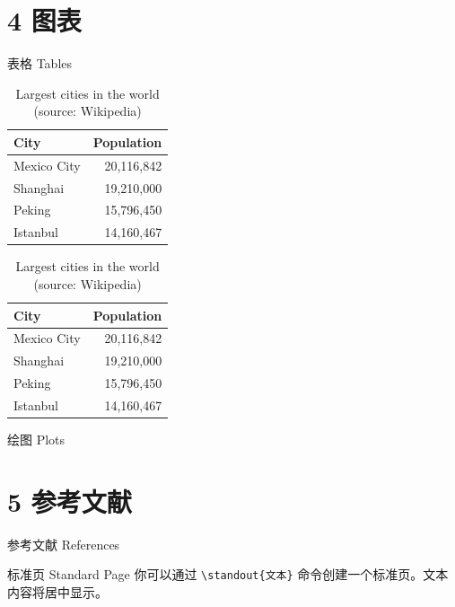 \documentclass[10pt,aspectratio=169,fontset=none]{ctexbeamer}
\begin{document}
    \section{4 图表}

    \begin{frame}{表格 Tables}
            \begin{table}
            \caption{Largest cities in the world (source: Wikipedia)}
            \label{tab:table1}
            \begin{tabular}{@{} lr @{}}
            \toprule
            City & Population\\
            \midrule
            Mexico City & 20,116,842\\
            Shanghai & 19,210,000\\
            Peking & 15,796,450\\
            Istanbul & 14,160,467\\
            \bottomrule
            \end{tabular}
            \hspace*{1cm}
              \setlength\extrarowheight{3pt}
            \begin{tabular}{|lr|}
            \hline
            \rowcolor{primary}\color{background}City & \color{background}Population\\
            \hline
            Mexico City & 20,116,842\\
            Shanghai & 19,210,000\\
            Peking & 15,796,450\\
            Istanbul & 14,160,467\\
            \hline
            \end{tabular}
        \end{table}
    \end{frame}

    \begin{frame}{绘图 Plots}
       
    
    \end{frame}

    \section{5 参考文献}

    \begin{frame}{参考文献 References}
         
        
    \end{frame}

    \begin{frame}{标准页 Standard Page}
        你可以通过 \texttt{\textcolor{primary}{\textbackslash standout}\{文本\}} 命令创建一个标准页。文本内容将居中显示。
    \end{frame}

\end{document}
